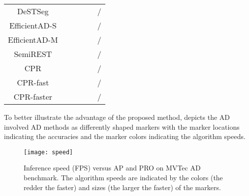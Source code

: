 \documentclass[lettersize,journal]{IEEEtran}
\begin{document}
\begin{table}[htbp]
{\begin{tabular}{ c | c | c | c | c | c  }
      DeSTSeg \cite{zhang2023destseg}             &                           &                           &                           &                           & /                                                 \\
      EfficientAD-S \cite{batzner2023efficientad} &                           &                           &                           &                           & {\color{blue}{}}/                      \\
      EfficientAD-M \cite{batzner2023efficientad} &                           &                           &                           &                           & /                                               \\
      SemiREST \cite{li2023efficient}             &                           & {\color{red}{}}  &                           &                           & /                                                   \\
      \hline
      CPR                                         & {\color{red}{}}  & {\color{red}{}}  & {\color{red}{}}  & {\color{red}{}}  & /                                                  \\
      CPR-fast                                    & {\color{red}{}}  & {\color{red}{}}  & {\color{blue}{}} & {\color{blue}{}} & /{\color{blue}{}}                         \\
      CPR-faster                                  &                           & {\color{blue}{}} &                           &                           & {\color{red}{}}/{\color{red}{}} \\
      \hline
    \end{tabular}
  }
\end{table}

To better illustrate the advantage of the proposed method,  depicts the AD
involved AD methods as differently shaped markers with the marker locations indicating the
accuracies and the marker colors indicating the algorithm speeds.

\begin{figure}[htbp]
  \centering
  \texttt{[image: speed]}
  \caption{Inference speed (FPS) versus AP and PRO on MVTec AD benchmark. The algorithm speeds are indicated by the colors (the redder the faster) and sizes (the larger the faster) of the markers. }
  \label{fig:speed}
  \vspace{-2.0em}
\end{figure}
\end{document}
